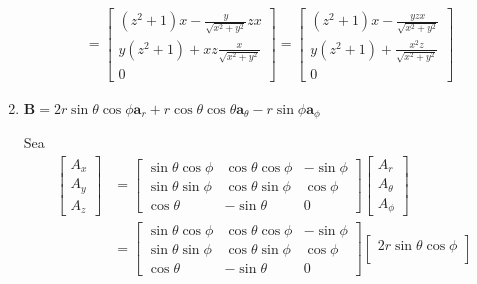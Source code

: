 \begin{problema}
\begin{enumerate}
\begin{sol}
\begin{align*}
            &= \begin{bmatrix}
                (z^2+1)x -\frac{y}{\sqrt{x^2+y^2}}z x\\
                y(z^2+1)+xz \frac{x}{\sqrt{x^2+y^2}}\\
                0
            \end{bmatrix} = \begin{bmatrix}
                (z^2+1)x -\frac{yzx}{\sqrt{x^2+y^2}}\\
                y(z^2+1)+\frac{x^2z}{\sqrt{x^2+y^2}}\\
                0
            \end{bmatrix}
        \end{align*}
    \end{sol}

    \item $\mathbf{B}=2 r \sin \theta \cos \phi \mathbf{a}_{r}+r \cos \theta \cos \theta \mathbf{a}_{\theta}-r \sin \phi \mathbf{a}_{\phi}$
    \begin{sol}
        Sea 
        \begin{align*}
            \begin{bmatrix}
                A_x\\
                A_y\\
                A_z
            \end{bmatrix} &= \begin{bmatrix}
                \sin \theta \cos\phi & \cos\theta \cos\phi &-\sin\phi\\
                \sin\theta \sin\phi & \cos\theta \sin\phi &\cos \phi\\
                \cos\theta & -\sin \theta & 0
            \end{bmatrix}\begin{bmatrix}
                A_r\\
                A_\theta\\
                A_\phi
            \end{bmatrix}\\
            &= \begin{bmatrix}
                \sin \theta \cos\phi & \cos\theta \cos\phi &-\sin\phi\\
                \sin\theta \sin\phi & \cos\theta \sin\phi &\cos \phi\\
                \cos\theta & -\sin \theta & 0
            \end{bmatrix}\begin{bmatrix}
                2r\sin \theta \cos\phi\\

\end{bmatrix}
\end{align*}
\end{sol}
\end{enumerate}
\end{problema}
